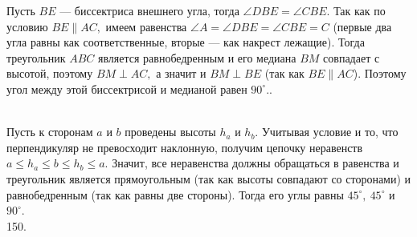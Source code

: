 \documentclass[12pt]{article}
\begin{document}
Пусть $BE$ --- биссектриса внешнего угла, тогда $\angle DBE=\angle CBE.$ Так как по условию $BE\parallel AC,$ имеем равенства $\angle A=\angle DBE=\angle CBE=C$ (первые два угла равны как соответственные, вторые --- как накрест лежащие). Тогда треугольник $ABC$ является равнобедренным и его медиана $BM$ совпадает с высотой, поэтому $BM\perp AC,$ а значит и $BM\perp BE$ (так как $BE\parallel AC$). Поэтому угол между этой биссектрисой и медианой равен $90^\circ.$\newpage{}. \begin{figure}[ht!]
\end{figure}\\
Пусть к сторонам $a$ и $b$ проведены высоты $h_a$ и $h_b.$ Учитывая условие и то, что перпендикуляр не превосходит наклонную, получим цепочку неравенств $a\leqslant h_a\leqslant b \leqslant h_b \leqslant a.$ Значит, все неравенства должны обращаться в равенства и треугольник является прямоугольным (так как высоты совпадают со сторонами) и равнобедренным (так как равны две стороны). Тогда его углы равны $45^\circ,\ 45^\circ$ и $90^\circ.$\\
150. \begin{figure}[ht!]
\end{figure}\\
\end{document}
